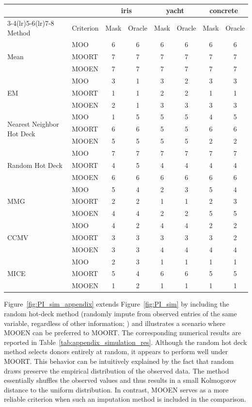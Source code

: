 \documentclass[aos, preprint]{imsart}
\theoremstyle{plain}
\theoremstyle{definition}
\begin{document}
\begin{appendix}
\begin{table}[htbp!]
\\
\begin{tabular}{@{}llcccccc@{}}
\toprule
& & \multicolumn{2}{c}{iris} & \multicolumn{2}{c}{yacht} & \multicolumn{2}{c}{concrete} \\
\cmidrule(lr){3-4}\cmidrule(lr){5-6}\cmidrule(lr){7-8}
Method & Criterion & Mask & Oracle & Mask  & Oracle & Mask  & Oracle \\
\midrule
\multirow{3}{*}{Mean} 
& MOO & 6 & 6 & 6 & 6 & 6 & 6\\
& MOORT & 7 & 7 & 7 & 7 & 7 & 7\\
& MOOEN & 7 & 7 & 7 & 7 & 7 & 7\\
\midrule
\multirow{3}{*}{EM} 
& MOO & 3 & 1 & 3 & 2 & 3 & 3\\
& MOORT & 1 & 1 & 2 & 2 & 1 & 1\\
& MOOEN & 2 & 1 & 3 & 3 & 3 & 3\\
\midrule
\multirow{3}{*}{Nearest Neighbor Hot Deck} 
& MOO & 1 & 5 & 5 & 5 & 4 & 5\\
 & MOORT & 6 & 6 & 5 & 5 & 6 & 6\\
 & MOOEN & 5 & 5 & 5 & 5 & 2 & 2\\
\midrule
\multirow{3}{*}{Random Hot Deck} 
& MOO & 7 & 7 & 7 & 7 & 7 & 7\\
 & MOORT & 4 & 5 & 4 & 4 & 4 & 4\\
 & MOOEN & 6 & 6 & 6 & 6 & 6 & 6\\
\midrule
\multirow{3}{*}{MMG}
& MOO & 5 & 4 & 2 & 3 & 5 & 4\\
 & MOORT & 2 & 2 & 1 & 1 & 2 & 3\\
 & MOOEN & 4 & 4 & 2 & 2 & 5 & 5\\
\midrule
\multirow{3}{*}{CCMV} 
& MOO & 4 & 2 & 4 & 4 & 2 & 2\\
 & MOORT & 3 & 3 & 3 & 3 & 3 & 2\\
 & MOOEN & 3 & 3 & 4 & 4 & 4 & 4\\
\midrule
\multirow{3}{*}{MICE} 
& MOO & 2 & 3 & 1 & 1 & 1 & 1\\
 & MOORT & 5 & 4 & 6 & 6 & 5 & 5\\
 & MOOEN & 1 & 2 & 1 & 1 & 1 & 1\\
\bottomrule
\end{tabular}
\end{table}

Figure~\ref{fig:PI_sim_appendix} extends Figure~\ref{fig:PI_sim} by including the random hot-deck method (randomly impute from observed entries of the same variable, regardless of other information; \citealt{little2019statistical}) and illustrates a scenario where MOOEN can be preferred to MOORT. The corresponding numerical results are reported in Table~\ref{tab:appendix_simulation_res}. Although the random hot deck method selects donors entirely at random, 
it appears to perform well under MOORT. This behavior can be intuitively explained by the fact that random draws preserve the empirical distribution of the observed data. The method essentially shuffles the observed values and thus results in a small Kolmogorov distance to the uniform distribution. In contrast, MOOEN serves as a more reliable criterion when such an imputation method is included in the comparison.


\end{appendix}
\end{document}
